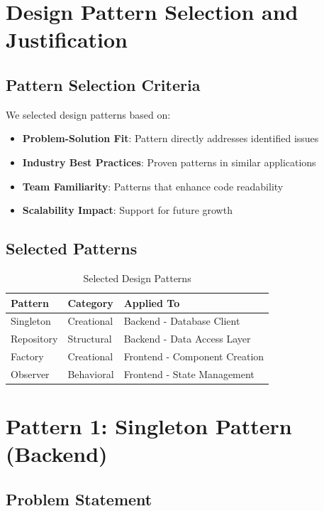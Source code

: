 \documentclass[12pt,a4paper]{article}
\begin{document}
\newpage

\section{Design Pattern Selection and Justification}

\subsection{Pattern Selection Criteria}

We selected design patterns based on:
\begin{itemize}
    \item \textbf{Problem-Solution Fit}: Pattern directly addresses identified issues
    \item \textbf{Industry Best Practices}: Proven patterns in similar applications
    \item \textbf{Team Familiarity}: Patterns that enhance code readability
    \item \textbf{Scalability Impact}: Support for future growth
\end{itemize}

\subsection{Selected Patterns}

\begin{table}[H]
\centering
\begin{tabular}{|l|l|l|}
\hline
\textbf{Pattern} & \textbf{Category} & \textbf{Applied To} \\
\hline
Singleton & Creational & Backend - Database Client \\
Repository & Structural & Backend - Data Access Layer \\
Factory & Creational & Frontend - Component Creation \\
Observer & Behavioral & Frontend - State Management \\
\hline
\end{tabular}
\caption{Selected Design Patterns}
\end{table}

\newpage

\section{Pattern 1: Singleton Pattern (Backend)}

\subsection{Problem Statement}
\end{document}
